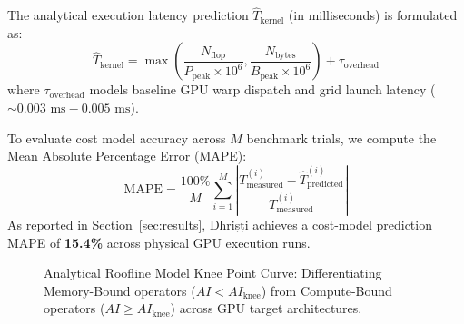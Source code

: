 \documentclass[10pt,journal,compsoc]{IEEEtran}
\begin{document}
The analytical execution latency prediction $\hat{T}_{\text{kernel}}$ (in milliseconds) is formulated as:
\begin{equation}
\hat{T}_{\text{kernel}} = \max \left( \frac{N_{\text{flop}}}{P_{\text{peak}} \times 10^6}, \frac{N_{\text{bytes}}}{B_{\text{peak}} \times 10^6} \right) + \tau_{\text{overhead}}
\end{equation}
where $\tau_{\text{overhead}}$ models baseline GPU warp dispatch and grid launch latency ($\sim 0.003\text{ ms} - 0.005\text{ ms}$).

To evaluate cost model accuracy across $M$ benchmark trials, we compute the Mean Absolute Percentage Error (MAPE):
\begin{equation}
\text{MAPE} = \frac{100\%}{M} \sum_{i=1}^{M} \left| \frac{T_{\text{measured}}^{(i)} - \hat{T}_{\text{predicted}}^{(i)}}{T_{\text{measured}}^{(i)}} \right|
\end{equation}
As reported in Section~\ref{sec:results}, Dhri\d{s}\d{t}i achieves a cost-model prediction MAPE of \textbf{15.4\%} across physical GPU execution runs.

\begin{figure}[t]
\centering
{}
\caption{Analytical Roofline Model Knee Point Curve: Differentiating Memory-Bound operators ($AI < AI_{\text{knee}}$) from Compute-Bound operators ($AI \ge AI_{\text{knee}}$) across GPU target architectures.}
\label{fig:roofline_knee}
\end{figure}
\end{document}
